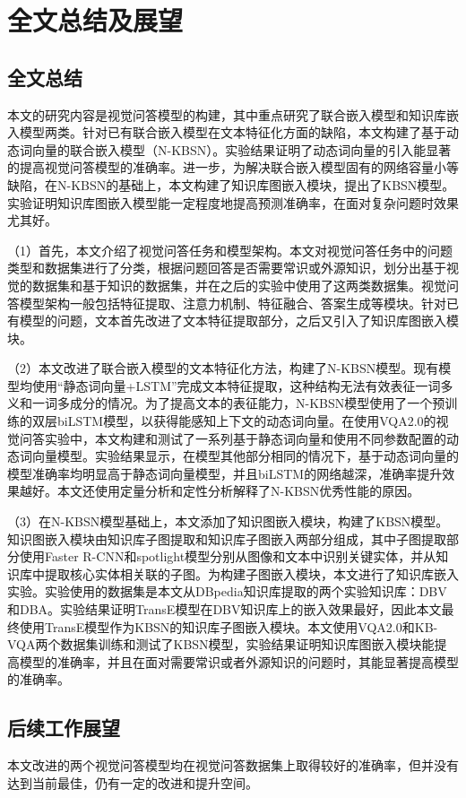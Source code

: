 \chapter{全文总结及展望}
\section{全文总结}
本文的研究内容是视觉问答模型的构建，其中重点研究了联合嵌入模型和知识库嵌入模型两类。针对已有联合嵌入模型在文本特征化方面的缺陷，本文构建了基于动态词向量的联合嵌入模型（N-KBSN）。实验结果证明了动态词向量的引入能显著的提高视觉问答模型的准确率。进一步，为解决联合嵌入模型固有的网络容量小等缺陷，在N-KBSN的基础上，本文构建了知识库图嵌入模块，提出了KBSN模型。实验证明知识库图嵌入模型能一定程度地提高预测准确率，在面对复杂问题时效果尤其好。

（1）首先，本文介绍了视觉问答任务和模型架构。本文对视觉问答任务中的问题类型和数据集进行了分类，根据问题回答是否需要常识或外源知识，划分出基于视觉的数据集和基于知识的数据集，并在之后的实验中使用了这两类数据集。视觉问答模型架构一般包括特征提取、注意力机制、特征融合、答案生成等模块。针对已有模型的问题，文本首先改进了文本特征提取部分，之后又引入了知识库图嵌入模块。

（2）本文改进了联合嵌入模型的文本特征化方法，构建了N-KBSN模型。现有模型均使用“静态词向量+LSTM”完成文本特征提取，这种结构无法有效表征一词多义和一词多成分的情况。为了提高文本的表征能力，N-KBSN模型使用了一个预训练的双层biLSTM模型，以获得能感知上下文的动态词向量。在使用VQA2.0的视觉问答实验中，本文构建和测试了一系列基于静态词向量和使用不同参数配置的动态词向量模型。实验结果显示，在模型其他部分相同的情况下，基于动态词向量的模型准确率均明显高于静态词向量模型，并且biLSTM的网络越深，准确率提升效果越好。本文还使用定量分析和定性分析解释了N-KBSN优秀性能的原因。

（3）在N-KBSN模型基础上，本文添加了知识图嵌入模块，构建了KBSN模型。知识图嵌入模块由知识库子图提取和知识库子图嵌入两部分组成，其中子图提取部分使用Faster R-CNN和spotlight模型分别从图像和文本中识别关键实体，并从知识库中提取核心实体相关联的子图。为构建子图嵌入模块，本文进行了知识库嵌入实验。实验使用的数据集是本文从DBpedia知识库提取的两个实验知识库：DBV和DBA。实验结果证明TransE模型在DBV知识库上的嵌入效果最好，因此本文最终使用TransE模型作为KBSN的知识库子图嵌入模块。本文使用VQA2.0和KB-VQA两个数据集训练和测试了KBSN模型，实验结果证明知识库图嵌入模块能提高模型的准确率，并且在面对需要常识或者外源知识的问题时，其能显著提高模型的准确率。

\section{后续工作展望}
本文改进的两个视觉问答模型均在视觉问答数据集上取得较好的准确率，但并没有达到当前最佳，仍有一定的改进和提升空间。

